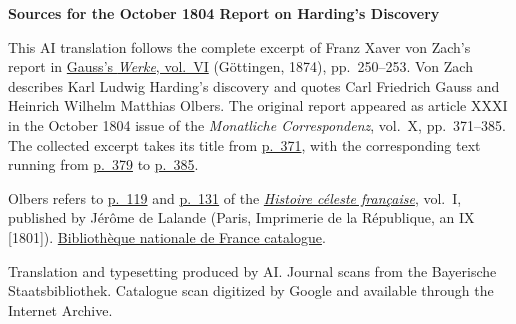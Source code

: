 \clearpage\thispagestyle{empty}
\begin{center}\textbf{Sources for the October 1804 Report on Harding’s Discovery}\end{center}
\noindent This AI translation follows the complete excerpt of Franz Xaver von Zach’s report in \href{https://gdz.sub.uni-goettingen.de/id/PPN236007467}{Gauss’s \textit{Werke}, vol.~VI} (Göttingen, 1874), pp.~250--253. Von Zach describes Karl Ludwig Harding’s discovery and quotes Carl Friedrich Gauss and Heinrich Wilhelm Matthias Olbers. The original report appeared as article XXXI in the October 1804 issue of the \textit{Monatliche Correspondenz}, vol.~X, pp.~371--385. The collected excerpt takes its title from \href{https://www.digitale-sammlungen.de/en/view/bsb10538602?page=385}{p.~371}, with the corresponding text running from \href{https://www.digitale-sammlungen.de/en/view/bsb10538602?page=393}{p.~379} to \href{https://www.digitale-sammlungen.de/en/view/bsb10538602?page=399}{p.~385}.
\par\smallskip\noindent Olbers refers to \href{https://archive.org/download/histoireclestef00lalagoog/page/n146.jpg}{p.~119} and \href{https://archive.org/download/histoireclestef00lalagoog/page/n158.jpg}{p.~131} of the \href{https://archive.org/download/histoireclestef00lalagoog/page/n12.jpg}{\textit{Histoire céleste française}}, vol.~I, published by Jérôme de Lalande (Paris, Imprimerie de la République, an IX [1801]). \href{https://catalogue.bnf.fr/ark:/12148/cb30722242z}{Bibliothèque nationale de France catalogue}.
\par\smallskip\noindent Translation and typesetting produced by AI. Journal scans from the Bayerische Staatsbibliothek. Catalogue scan digitized by Google and available through the Internet Archive.
\clearpage
